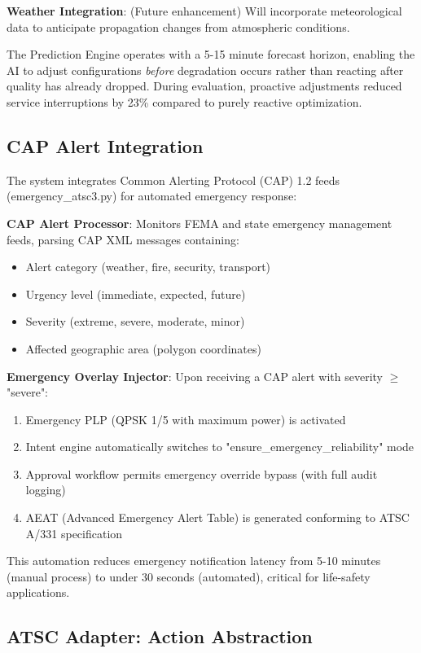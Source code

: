 \documentclass[conference]{IEEEtran}
\begin{document}
\textbf{Weather Integration}: (Future enhancement) Will incorporate meteorological data to anticipate propagation changes from atmospheric conditions.

The Prediction Engine operates with a 5-15 minute forecast horizon, enabling the AI to adjust configurations \textit{before} degradation occurs rather than reacting after quality has already dropped. During evaluation, proactive adjustments reduced service interruptions by 23\% compared to purely reactive optimization.

\subsection{CAP Alert Integration}

The system integrates Common Alerting Protocol (CAP) 1.2 feeds (emergency\_atsc3.py) for automated emergency response:

\textbf{CAP Alert Processor}: Monitors FEMA and state emergency management feeds, parsing CAP XML messages containing:
\begin{itemize}
\item Alert category (weather, fire, security, transport)
\item Urgency level (immediate, expected, future)
\item Severity (extreme, severe, moderate, minor)
\item Affected geographic area (polygon coordinates)
\end{itemize}

\textbf{Emergency Overlay Injector}: Upon receiving a CAP alert with severity $\geq$ "severe":
\begin{enumerate}
\item Emergency PLP (QPSK 1/5 with maximum power) is activated
\item Intent engine automatically switches to "ensure\_emergency\_reliability" mode
\item Approval workflow permits emergency override bypass (with full audit logging)
\item AEAT (Advanced Emergency Alert Table) is generated conforming to ATSC A/331 specification
\end{enumerate}

This automation reduces emergency notification latency from 5-10 minutes (manual process) to under 30 seconds (automated), critical for life-safety applications.

\subsection{ATSC Adapter: Action Abstraction}
\end{document}
